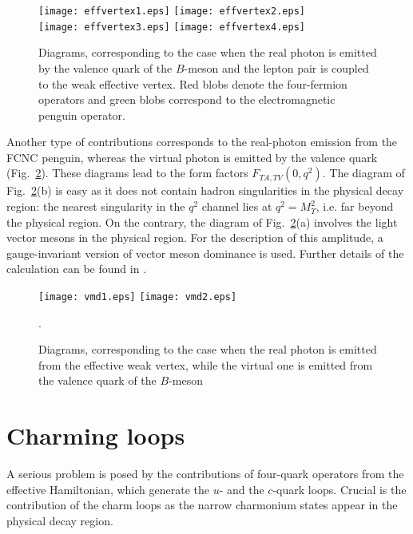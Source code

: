 \documentclass{PoS}
\begin{document}
\begin{figure}[H]
\centering    
\texttt{[image: effvertex1.eps]}     
\hspace{8mm}
\texttt{[image: effvertex2.eps]}\\
\hspace{8mm}
\texttt{[image: effvertex3.eps]}
\hspace{8mm}
\texttt{[image: effvertex4.eps]}
\caption{Diagrams, corresponding to the case when the real photon is emitted 
by the valence quark of the $B$-meson and the lepton pair is coupled to the weak effective vertex. Red blobs denote the four-fermion operators and 
green blobs correspond to the electromagnetic penguin operator.}
\label{fig-effvertex} 
\end{figure}

Another type of contributions corresponds to the real-photon emission from the FCNC penguin, whereas the virtual photon is 
emitted by the valence quark (Fig.~\ref{fig-vmd}). These diagrams lead to the form factors $F_{TA,TV}(0,q^2)$. 
The diagram of Fig.~\ref{fig-vmd}(b) is easy as it does not contain hadron singularities in the physical decay region:  
the nearest singularity in the $q^2$ channel lies at $q^2=M_{\Upsilon}^2$, i.e. far beyond the physical region. 
On the contrary, the diagram of Fig.~\ref{fig-vmd}(a) involves the light vector mesons 
in the physical region. For the description of this amplitude, a gauge-invariant version of vector meson dominance is used. 
Further details of the calculation can be found in \cite{mn2004}.
\begin{figure}[H]
\centering
\label{fig-vmd}     
\texttt{[image: vmd1.eps]}     
\hspace{10mm}
\texttt{[image: vmd2.eps]}
\caption{Diagrams, corresponding to the case when the real photon is emitted from the effective weak vertex, 
while the virtual one is emitted from the valence quark of the $B$-meson}.
\end{figure}

\section{Charming loops}
A serious problem is posed by the contributions of four-quark operators from the effective Hamiltonian, which generate 
the $u$- and the $c$-quark loops. Crucial is the contribution of the charm loops as the narrow charmonium states appear
in the physical decay region. 
\end{document}
